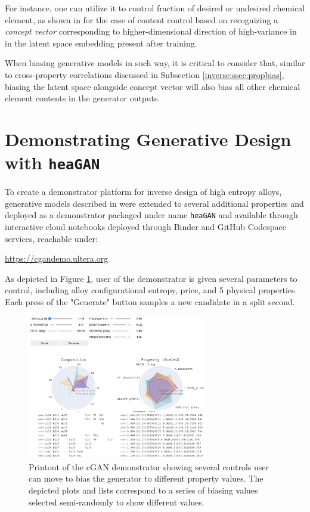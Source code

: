 For instance, one can utilize it to control fraction of desired or undesired chemical element, as shown in \citet{Debnath2023ComparingAlloys} for the case of  content control based on recognizing a \emph{concept vector} corresponding to higher-dimensional direction of high-variance in  in the latent space embedding present after training. 

When biasing generative models in such way, it is critical to consider that, similar to cross-property correlations discussed in Subsection \ref{inverse:ssec:propbias}, biasing the latent space alongside  concept vector will also bias all other chemical element contents in the generator outputs.


\section{Demonstrating Generative Design with \texttt{heaGAN}} \label{inverse:sec:heagan}

To create a demonstrator platform for inverse design of high entropy alloys, generative models described in \citet{Debnath2023ComparingAlloys} were extended to several additional properties and deployed as a demonstrator packaged under name \texttt{heaGAN} and available through interactive cloud notebooks deployed through Binder and GitHub Codespace services, reachable under:

\hspace{36pt}\href{https://cgandemo.ultera.org}{https://cgandemo.ultera.org}

As depicted in Figure \ref{inverse:fig:cgandemo}, user of the demonstrator is given several parameters to control, including alloy configurational entropy, price, and 5 physical properties. Each press of the "Generate" button samples a new candidate in a split second.

\begin{figure}[H]
    \centering
    \includegraphics[width=0.7\textwidth]{inversedesign/cgan_demo.png}
    \caption{Printout of the cGAN demonstrator showing several controls user can move to bias the generator to different property values. The depicted plots and lists correspond to a series of biasing values selected semi-randomly to show different values.}
    \label{inverse:fig:cgandemo}
\end{figure}

